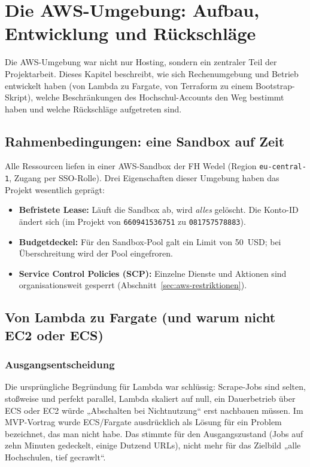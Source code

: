 \chapter{Die AWS-Umgebung: Aufbau, Entwicklung und Rückschläge}\label{ch:aws}

Die AWS-Umgebung war nicht nur Hosting, sondern ein zentraler Teil der Projektarbeit. Dieses Kapitel beschreibt, wie sich Rechenumgebung und Betrieb entwickelt haben (von Lambda zu Fargate, von Terraform zu einem Bootstrap-Skript), welche Beschränkungen des Hochschul-Accounts den Weg bestimmt haben und welche Rückschläge aufgetreten sind.

\section{Rahmenbedingungen: eine Sandbox auf Zeit}
Alle Ressourcen liefen in einer AWS-Sandbox der FH Wedel (Region \texttt{eu-central-1}, Zugang per SSO-Rolle). Drei Eigenschaften dieser Umgebung haben das Projekt wesentlich geprägt:
\begin{itemize}
  \item \textbf{Befristete Lease:} Läuft die Sandbox ab, wird \emph{alles} gelöscht. Die Konto-ID ändert sich (im Projekt von \texttt{660941536751} zu \texttt{081757578883}).
  \item \textbf{Budgetdeckel:} Für den Sandbox-Pool galt ein Limit von 50~USD; bei Überschreitung wird der Pool eingefroren.
  \item \textbf{Service Control Policies (SCP):} Einzelne Dienste und Aktionen sind organisationsweit gesperrt (Abschnitt~\ref{sec:aws-restriktionen}).
\end{itemize}

\section{Von Lambda zu Fargate (und warum nicht EC2 oder ECS)}\label{sec:aws-lambda-fargate}

\subsection{Ausgangsentscheidung}
Die ursprüngliche Begründung für Lambda war schlüssig: Scrape-Jobs sind selten, stoßweise und perfekt parallel, Lambda skaliert auf null, ein Dauerbetrieb über ECS oder EC2 würde „Abschalten bei Nichtnutzung“ erst nachbauen müssen. Im MVP-Vortrag wurde ECS/Fargate ausdrücklich als Lösung für ein Problem bezeichnet, das man nicht habe. Das stimmte für den Ausgangszustand (Jobs auf zehn Minuten gedeckelt, einige Dutzend URLs), nicht mehr für das Zielbild „alle Hochschulen, tief gecrawlt“.

